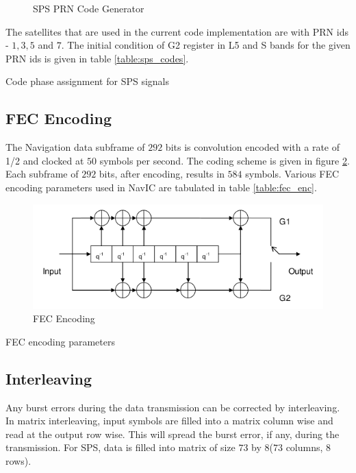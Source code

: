 \begin{figure}[!ht]
	\centering
	
	\caption{SPS PRN Code Generator}
	\label{figure:codeGen}
\end{figure}

\noindent The satellites that are used in the current code implementation are with PRN ids - $1,3,5$ and $7$. The initial condition of G2 register in L5 and S bands for the given PRN ids is given in table \ref{table:sps_codes}.

\begin{table}[h]

\vspace{3mm}
\caption{Code phase assignment for SPS signals}
\label{table:sps_codes}
\end{table}

\newpage
\subsection{FEC Encoding}
The Navigation data subframe of $292$ bits is convolution encoded with a rate of 1/2 and clocked at $50$ symbols per second. The coding scheme is given in figure \ref{fig:FEC}. Each subframe of $292$ bits, after encoding, results in $584$ symbols. Various FEC encoding parameters used in NavIC are tabulated in table \ref{table:fec_enc}.
\begin{figure}[ht]
\centering
\includegraphics[width=\columnwidth]{figs/FEC.png}
\centering
\captionsetup{justification=centering}
\caption{FEC Encoding}
\label{fig:FEC}
\end{figure}
\newpage
\begin{table}[h]

\vspace{3mm}
\caption{FEC encoding parameters}
\label{table:fec_enc}
\end{table}
\subsection{Interleaving}
Any burst errors during the data transmission can be corrected by interleaving. In matrix interleaving, input symbols are filled into a matrix column wise and read at the output row wise. This will spread the burst error, if any, during the transmission. For SPS, data is filled into matrix of size $73$ by $8$($73$ columns, $8$ rows).
